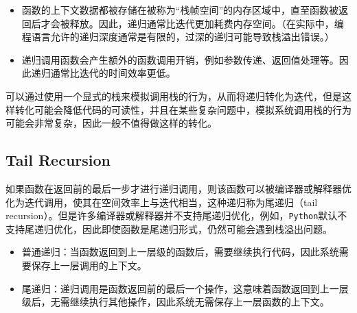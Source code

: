 \begin{itemize}
    \item 函数的上下文数据都被存储在被称为“栈帧空间”的内存区域中，直至函数被返回后才会被释放。因此，递归通常比迭代更加耗费内存空间。（在实际中，编程语言允许的递归深度通常是有限的，过深的递归可能导致栈溢出错误。）
    \item 递归调用函数会产生额外的函数调用开销，例如参数传递、返回值处理等。因此递归通常比迭代的时间效率更低。
\end{itemize}

可以通过使用一个显式的栈来模拟调用栈的行为，从而将递归转化为迭代，但是这样转化可能会降低代码的可读性，并且在某些复杂问题中，模拟系统调用栈的行为可能会非常复杂，因此一般不值得做这样的转化。

\subsection{Tail Recursion}
如果函数在返回前的最后一步才进行递归调用，则该函数可以被编译器或解释器优化为迭代调用，使其在空间效率上与迭代相当，这种递归称为尾递归（tail recursion）。但是许多编译器或解释器并不支持尾递归优化，例如，\texttt{Python}默认不支持尾递归优化，因此即使函数是尾递归形式，仍然可能会遇到栈溢出问题。

\begin{itemize}
    \item 普通递归：当函数返回到上一层级的函数后，需要继续执行代码，因此系统需要保存上一层调用的上下文。
    \item 尾递归：递归调用是函数返回前的最后一个操作，这意味着函数返回到上一层级后，无需继续执行其他操作，因此系统无需保存上一层函数的上下文。
\end{itemize}


